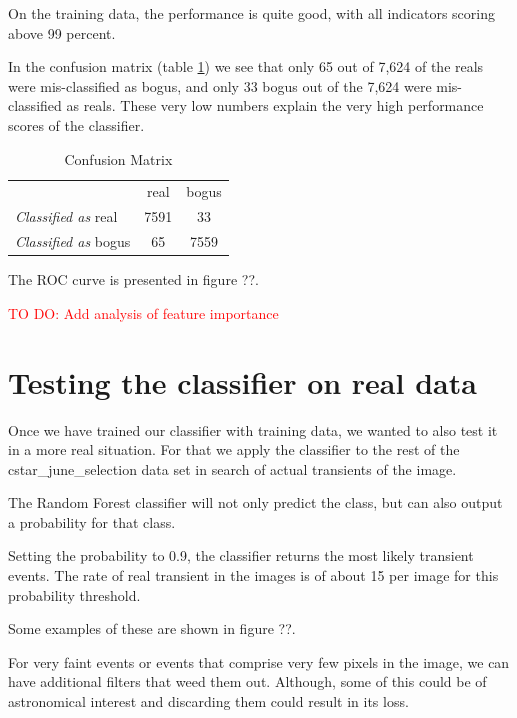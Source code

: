 On the training data, the performance is quite good, with all indicators scoring above 99 percent.

In the confusion matrix (table \ref{mlconfusionmatrix}) we see that only 65 out of 7,624 of the reals were mis-classified as bogus, and only 33 bogus out of the 7,624 were mis-classified as reals. These very low numbers explain the very high performance scores of the classifier.

\begin{table}
\centering
\begin{tabular}{ l|c|c| }
\multicolumn{1}{r}{}
 &  \multicolumn{1}{c}{real}
 & \multicolumn{1}{c}{bogus} \\
\cline{2-3}
{\it Classified as} real & 7591 & 33 \\
\cline{2-3}
{\it Classified as} bogus & 65 & 7559 \\
\cline{2-3}
\end{tabular}
\caption{Confusion Matrix}
\label{mlconfusionmatrix}
\end{table}

The ROC curve is presented in figure ??.

\textcolor{red}{TO DO: Add analysis of feature importance}

\section{Testing the classifier on real data}

Once we have trained our classifier with training data, we wanted to also test it in a more real situation. For that we apply the classifier to the rest of the cstar\_june\_selection data set in search of actual transients of the image.

The Random Forest classifier will not only predict the class, but can also output a probability for that class.

Setting the probability to 0.9, the classifier returns the most likely transient events. The rate of real transient in the images is of about 15 per image for this probability threshold.

Some examples of these are shown in figure ??.

For very faint events or events that comprise very few pixels in the image, we can have additional filters that weed them out. Although, some of this could be of astronomical interest and discarding them could result in its loss.

